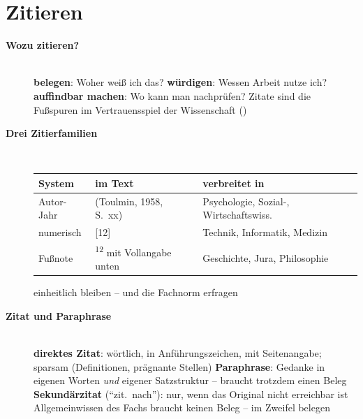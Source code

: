 \section{Zitieren}
\begin{description}
\item[{\rot\bf Wozu zitieren?}]~\\[-\lblskip]
\bi
  \ite \textbf{belegen}: Woher weiß ich das?
  \ite \textbf{würdigen}: Wessen Arbeit nutze ich?
  \ite \textbf{auffindbar machen}: Wo kann man nachprüfen?
  \ite Zitate sind die Fußspuren im Vertrauensspiel der Wissenschaft
    ()
\ei
\os{\newpage}

\item[{\rot\bf Drei Zitierfamilien}]~\\[-\lblskip]
\begin{center}\nsl{\small}
\begin{tabular}{p{}p{}p{}}
\toprule
\textbf{System} & \textbf{im Text} & \textbf{verbreitet in} \\
\midrule
Autor-Jahr & (Toulmin, 1958, S.~xx) & Psychologie, Sozial-, Wirtschaftswiss. \\
numerisch & [12] & Technik, Informatik, Medizin \\
Fußnote & \textsuperscript{12} mit Vollangabe unten & Geschichte, Jura, Philosophie \\
\bottomrule
\end{tabular}
\end{center}
\bi
  \ite einheitlich bleiben -- und die Fachnorm erfragen
\ei
\os{\newpage}

\item[{\rot\bf Zitat und Paraphrase}]~\\[-\lblskip]
\bi
  \ite \textbf{direktes Zitat}: wörtlich, in Anführungszeichen, mit
    Seitenangabe; sparsam (Definitionen, prägnante Stellen)
  \ite \textbf{Paraphrase}: Gedanke in eigenen Worten \emph{und} eigener
    Satzstruktur -- braucht trotzdem einen Beleg
  \ite \textbf{Sekundärzitat} (\enquote{zit.\ nach}): nur, wenn das
    Original nicht erreichbar ist
  \ite Allgemeinwissen des Fachs braucht keinen Beleg -- im Zweifel
    belegen
\ei
\os{\newpage}
\end{description}

